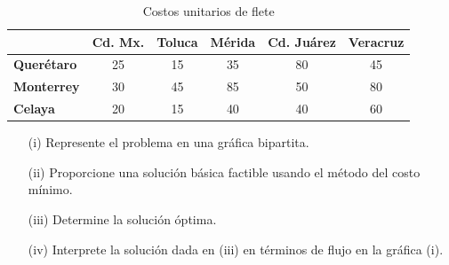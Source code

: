 \documentclass{article}
\begin{document}
\begin{table}[h!]
    \centering
    \begin{tabular}{|l|c|c|c|c|c|}
        \hline
                           & \textbf{Cd. Mx.} & \textbf{Toluca} & \textbf{Mérida} & \textbf{Cd. Juárez} & \textbf{Veracruz} \\ \hline
        \textbf{Querétaro} & 25               & 15              & 35              & 80                  & 45                \\ \hline
        \textbf{Monterrey} & 30               & 45              & 85              & 50                  & 80                \\ \hline
        \textbf{Celaya}    & 20               & 15              & 40              & 40                  & 60                \\ \hline
    \end{tabular}
    \caption{Costos unitarios de flete}
\end{table}

\begin{enumerate}
    \item[(i)] Represente el problema en una gráfica bipartita.
    \item[(ii)] Proporcione una solución básica factible usando el método del costo mínimo.
    \item[(iii)] Determine la solución óptima.
    \item[(iv)] Interprete la solución dada en (iii) en términos de flujo en la gráfica (i).
\end{enumerate}
\end{document}
